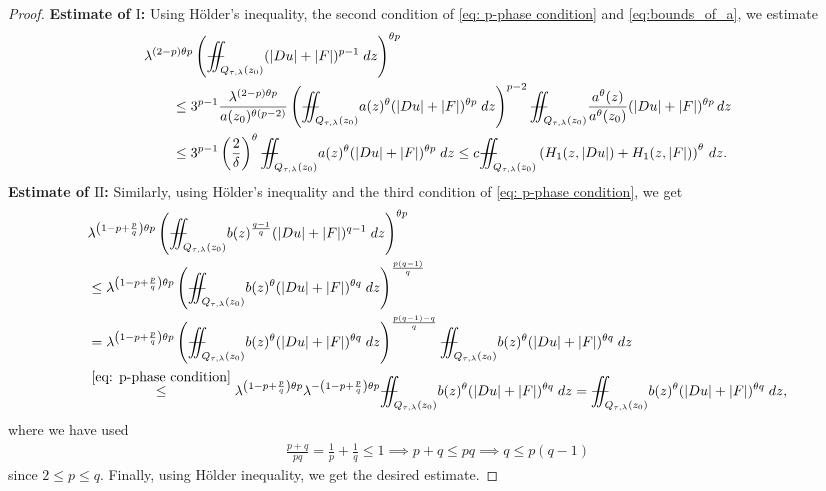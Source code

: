 \documentclass[11pt,oneside, english,reqno,twoside a4paper]{amsart}
\theoremstyle{definition}
\numberwithin{theorem}{section}
\numberwithin{equation}{section}
\newcommand{\iintss}{{\int\hspace{-0.28cm}\int}}
\newcommand{ \miints }{{\iintss\hspace{-0.56cm} -\hspace{-0.15cm}-}}
\newcommand{\miint}[1]{{\miints_{\hspace{-0.13cm}#1}}}
\begin{document}
\begin{proof}
\noindent\textbf{Estimate of $\mathrm{I}$:}
Using H\"{o}lder's inequality, the second condition of  \eqref{eq: p-phase condition} and \eqref{eq:bounds_of_a}, we estimate
\begin{align*}
&\lambda^{(2-p)\theta p}\left(\miint{Q_{\tau,\lambda}(z_0)}(|Du|+|F|)^{p-1} \; dz\right)^{\theta p}\\
&\qquad \leq 3^{p-1}\frac{\lambda^{(2-p)\theta p}}{a(z_0)^{\theta(p-2)}}\left(\miint{Q_{\tau,\lambda}(z_0)}a(z)^{\theta}(|Du|+|F|)^{\theta p} \; dz\right)^{p-2} \miint{Q_{\tau,\lambda}(z_0)}\frac{a^{\theta}(z)}{a^{\theta}(z_0)}(|Du|+|F|)^{\theta p}\, dz\\
&\qquad\leq 3^{p-1}\left(\frac{2}{\delta}\right)^{\theta}\miint{Q_{\tau,\lambda}(z_0)}a(z)^{\theta}(|Du|+|F|)^{\theta p} \; dz\leq c \miint{Q_{\tau,\lambda}(z_0)}\left(H_1(z, |Du|)+H_1(z, |F|)\right)^{\theta}\, dz.
\end{align*}
\textbf{Estimate of $\mathrm{II}$:} Similarly, using H\"{o}lder's inequality and the third condition of  \eqref{eq: p-phase condition}, we get
\begin{align*}
&\lambda^{\left(1-p+\frac{p}{q}\right)\theta p}\left(\miint{Q_{\tau,\lambda}(z_0)} b(z)^{\frac{q-1}{q}}(|Du|+|F|)^{q-1}\; dz \right)^{\theta p}\\
&\leq \lambda^{\left(1-p+\frac{p}{q}\right)\theta p}\left(\miint{Q_{\tau,\lambda}(z_0)} b(z)^{\theta}(|Du|+|F|)^{\theta q}\; dz \right)^{\frac{p(q-1)}{q}}\\
&=\lambda^{\left(1-p+\frac{p}{q}\right)\theta p}\left(\miint{Q_{\tau,\lambda}(z_0)} b(z)^{\theta}(|Du|+|F|)^{\theta q}\; dz \right)^{\frac{p(q-1)-q}{q}} \miint{Q_{\tau,\lambda}(z_0)} b(z)^{\theta}(|Du|+|F|)^{\theta q}\; dz \\
&\overset{\eqref{eq: p-phase condition}}{\leq}\lambda^{\left(1-p+\frac{p}{q}\right)\theta p}\lambda^{-\left(1-p+\frac{p}{q}\right)\theta p}\miint{Q_{\tau,\lambda}(z_0)} b(z)^{\theta}(|Du|+|F|)^{\theta q}\; dz=\miint{Q_{\tau,\lambda}(z_0)} b(z)^{\theta}(|Du|+|F|)^{\theta q}\; dz,
\end{align*}
where we have used
\begin{align*}
   \frac{p+q}{pq}=\frac{1}{p}+\frac{1}{q} \leq 1 \implies p+q\leq pq \implies q\leq p(q-1)
\end{align*}
since $2 \leq p \leq q$.
Finally, using H\"{o}lder inequality, we get the desired estimate.
\end{proof}
\end{document}
